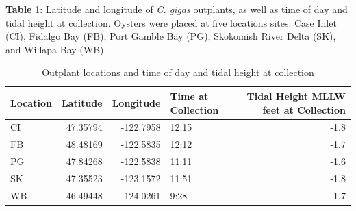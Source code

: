 \documentclass [11pt, proquest] {uwthesis}[2015/03/03]
\begin{document}
\textbf{Table} \ref{tab:deployment}: Latitude and longitude of \emph{C. gigas} outplants, as well as time of day and tidal height at collection. Oysters were placed at five locations sites: Case Inlet (CI), Fidalgo Bay (FB), Port Gamble Bay (PG), Skokomish River Delta (SK), and Willapa Bay (WB).

\begingroup\fontsize{10}{12}\selectfont
\begin{longtable}[t]{lrrlr}
\caption{\label{tab:deployment}Outplant locations and time of day and tidal height at collection}\\
\toprule
Location & Latitude & Longitude & Time at Collection & Tidal Height  MLLW  feet  at Collection\\
\midrule
CI & 47.35794 & -122.7958 & 12:15 & -1.8\\
FB & 48.48169 & -122.5835 & 12:12 & -1.7\\
PG & 47.84268 & -122.5838 & 11:11 & -1.6\\
SK & 47.35523 & -123.1572 & 11:51 & -1.8\\
WB & 46.49448 & -124.0261 & 9:28 & -1.7\\
\bottomrule
\end{longtable}
\endgroup{}
\clearpage
\end{document}
